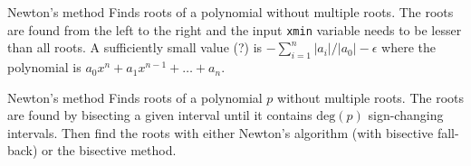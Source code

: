 \begin{algorithm}{Newton's method}
\desc
Finds roots of a polynomial without multiple roots. The roots are found from
the left to the right and the input {\tt xmin} variable needs to be lesser than
all roots. A sufficiently small value (?) is
$-\sum_{i=1}^n |a_i|/|a_0|-\epsilon$ where the polynomial is
$a_0 x^n + a_1 x^{n-1} + \dots + a_n$.
\end{algorithm}

\begin{algorithm}{Newton's method}
\desc
Finds roots of a polynomial $p$ without multiple roots. The roots are found by
bisecting a given interval until it contains $\mathrm{deg}(p)$ sign-changing
intervals. Then find the roots with either Newton's algorithm (with bisective
fall-back) or the bisective method.
\end{algorithm}









